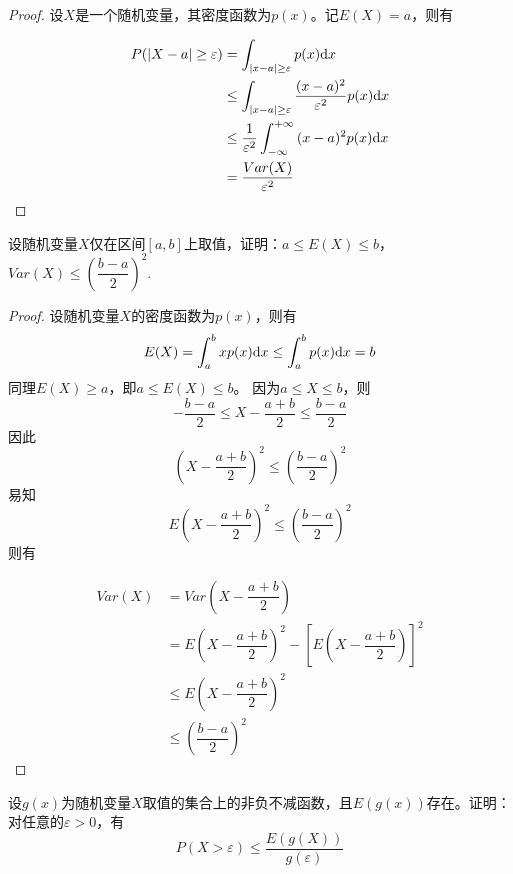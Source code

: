 \begin{proof}

    设$X$是一个随机变量，其密度函数为$p(x)$。记$E(X) = a$，则有

    \begin{align*}
        P(|X - a| \geq \varepsilon) & = \int_{|x - a| \geq \varepsilon}{p(x)}\mathrm{d} x \\
        & \leq \int_{|x - a| \geq \varepsilon}{\dfrac{(x - a)^2}{\varepsilon^2}p(x)}\mathrm{d} x \\
        & \leq \dfrac{1}{\varepsilon^2}\int_{-\infty}^{+\infty}{(x - a)^2p(x)}\mathrm{d} x \\
        & = \dfrac{Var(X)}{\varepsilon^2}
    \end{align*}
    
\end{proof}

\begin{proposition}
    
    设随机变量$X$仅在区间$[a,b]$上取值，证明：$a \leq E(X) \leq b$，$Var(X) \leq \left(\dfrac{b - a}{2}\right)^2$.

\end{proposition}

\begin{proof}

    设随机变量$X$的密度函数为$p(x)$，则有
    $$E(X) = \int_{a}^{b}{xp(x)}\mathrm{d} x \leq \int_{a}^{b}{p(x)}\mathrm{d} x = b$$
    同理$E(X) \geq a$，即$a \leq E(X) \leq b$。
    因为$a \leq X \leq b$，则
    $$-\dfrac{b - a}{2} \leq X - \dfrac{a + b}{2} \leq \dfrac{b - a}{2}$$
    因此
    $$\left(X - \dfrac{a + b}{2}\right)^2 \leq \left(\dfrac{b - a}{2}\right)^2$$
    易知
    $$E\left(X - \dfrac{a + b}{2}\right)^2 \leq \left(\dfrac{b - a}{2}\right)^2$$
    则有
    
    \begin{align*}
        Var(X) & = Var\left(X - \dfrac{a + b}{2}\right) \\
        & = E\left(X - \dfrac{a + b}{2}\right)^2 - \left[E\left(X - \dfrac{a + b}{2}\right)\right]^2 \\
        & \leq E\left(X - \dfrac{a + b}{2}\right)^2 \\
        & \leq \left(\dfrac{b - a}{2}\right)^2
    \end{align*}

\end{proof}

\begin{proposition}

    设$g(x)$为随机变量$X$取值的集合上的非负不减函数，且$E(g(x))$存在。证明：对任意的$\varepsilon > 0$，有
    $$P(X > \varepsilon) \leq \dfrac{E(g(X))}{g(\varepsilon)}$$

\end{proposition}

